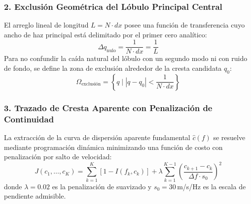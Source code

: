 \documentclass[11pt,a4paper]{article}
\begin{document}
\subsubsection{2. Exclusión Geométrica del Lóbulo Principal Central}
El arreglo lineal de longitud $L = N \cdot dx$ posee una función de transferencia cuyo ancho de haz principal está delimitado por el primer cero analítico:
\begin{equation}
    \Delta q_{\text{nulo}} = \frac{1}{N \cdot dx} = \frac{1}{L}
\end{equation}
Para no confundir la caída natural del lóbulo con un segundo modo ni con ruido de fondo, se define la zona de exclusión alrededor de la cresta candidata $q_0$:
\begin{equation}
    \Omega_{\text{exclusión}} = \left\{ q \;\Big|\; |q - q_0| < \frac{1}{N \cdot dx} \right\}
\end{equation}

\subsubsection{3. Trazado de Cresta Aparente con Penalización de Continuidad}
La extracción de la curva de dispersión aparente fundamental $\hat{c}(f)$ se resuelve mediante programación dinámica minimizando una función de costo con penalización por salto de velocidad:
\begin{equation}
    J(c_1, \dots, c_K) = \sum_{k=1}^{K} \left[ 1 - I(f_k, c_k) \right] + \lambda \sum_{k=1}^{K-1} \left( \frac{c_{k+1} - c_k}{\Delta f \cdot s_0} \right)^2
\end{equation}
donde $\lambda = 0.02$ es la penalización de suavizado y $s_0 = 30$\,m/s/Hz es la escala de pendiente admisible.
\end{document}

